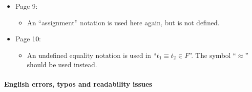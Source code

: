 \begin{itemize}
	\item Page 9:
	\begin{itemize}
		\item An ``assignment'' notation is used here again, but is not defined.
	\end{itemize}

	\item Page 10:
	\begin{itemize}
		\item An undefined equality notation is used in ``$t_1 \equiv t_2 \in F$''. The symbol ``$\approx$'' should be used instead.
	\end{itemize}
\end{itemize}


\clearpage
\paragraph{English errors, typos and readability issues}
\mbox{}


